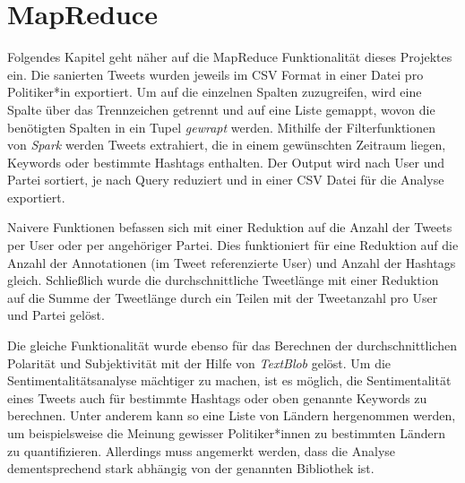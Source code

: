 \section{MapReduce}

Folgendes Kapitel geht näher auf die MapReduce Funktionalität dieses Projektes ein. Die sanierten Tweets wurden jeweils im CSV Format in einer Datei pro Politiker*in exportiert. Um auf die einzelnen Spalten zuzugreifen, wird eine Spalte über das Trennzeichen getrennt und auf eine Liste gemappt, wovon die benötigten Spalten in ein Tupel \textit{gewrapt} werden. Mithilfe der Filterfunktionen von \textit{Spark} werden Tweets extrahiert, die in einem gewünschten Zeitraum liegen, Keywords oder bestimmte Hashtags enthalten. Der Output wird nach User und Partei sortiert, je nach Query reduziert und in einer CSV Datei für die Analyse exportiert.


Naivere Funktionen befassen sich mit einer Reduktion auf die Anzahl der Tweets per User oder per angehöriger Partei. Dies funktioniert für eine Reduktion auf die Anzahl der Annotationen (im Tweet referenzierte User) und Anzahl der Hashtags gleich. Schließlich wurde die durchschnittliche Tweetlänge mit einer Reduktion auf die Summe der Tweetlänge durch ein Teilen mit der Tweetanzahl pro User und Partei gelöst.


Die gleiche Funktionalität wurde ebenso für das Berechnen der durchschnittlichen Polarität und Subjektivität mit der Hilfe von \textit{TextBlob} gelöst. Um die Sentimentalitätsanalyse mächtiger zu machen, ist es möglich, die Sentimentalität eines Tweets auch für bestimmte Hashtags oder oben genannte Keywords zu berechnen. Unter anderem kann so eine Liste von Ländern hergenommen werden, um beispielsweise die Meinung gewisser Politiker*innen zu bestimmten Ländern zu quantifizieren. Allerdings muss angemerkt werden, dass die Analyse dementsprechend stark abhängig von der genannten Bibliothek ist.